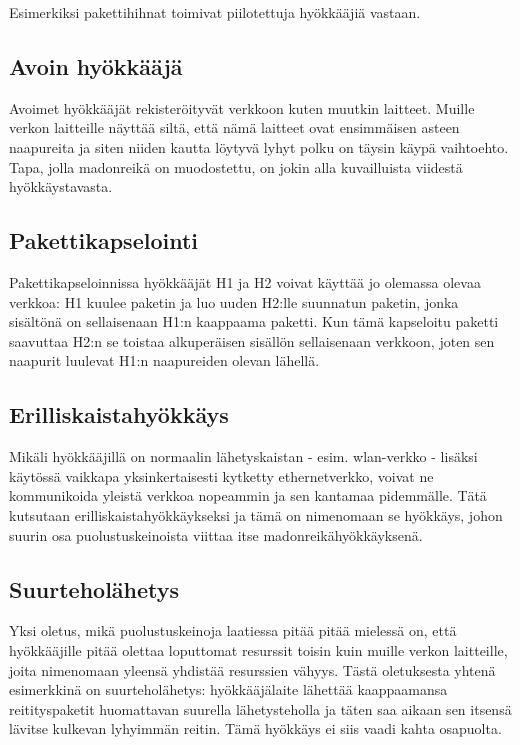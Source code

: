 \documentclass[finnish]{tktltiki2}
\theoremstyle{definition}
\theoremstyle{remark}
\begin{document}
Esimerkiksi pakettihihnat toimivat piilotettuja hyökkääjiä vastaan.

\subsection{Avoin hyökkääjä}

Avoimet hyökkääjät rekisteröityvät verkkoon kuten muutkin laitteet. Muille verkon laitteille näyttää siltä, että nämä laitteet ovat ensimmäisen asteen naapureita ja siten niiden kautta löytyvä lyhyt polku on täysin käypä vaihtoehto. Tapa, jolla madonreikä on muodostettu, on jokin alla kuvailluista viidestä hyökkäystavasta.

\subsection{Pakettikapselointi}

Pakettikapseloinnissa hyökkääjät H1 ja H2 voivat käyttää jo olemassa olevaa verkkoa: H1 kuulee paketin ja luo uuden H2:lle suunnatun paketin, jonka sisältönä on sellaisenaan H1:n kaappaama paketti. Kun tämä kapseloitu paketti saavuttaa H2:n se toistaa alkuperäisen sisällön sellaisenaan verkkoon, joten sen naapurit luulevat H1:n naapureiden olevan lähellä.

\subsection{Erilliskaistahyökkäys}

Mikäli hyökkääjillä on normaalin lähetyskaistan - esim. wlan-verkko - lisäksi käytössä vaikkapa yksinkertaisesti kytketty ethernetverkko, voivat ne kommunikoida yleistä verkkoa nopeammin ja sen kantamaa pidemmälle. Tätä kutsutaan erilliskaistahyökkäykseksi ja tämä on nimenomaan se hyökkäys, johon suurin osa puolustuskeinoista viittaa itse madonreikähyökkäyksenä.

\subsection{Suurteholähetys}

Yksi oletus, mikä puolustuskeinoja laatiessa pitää pitää mielessä on, että hyökkääjille pitää olettaa loputtomat resurssit toisin kuin muille verkon laitteille, joita nimenomaan yleensä yhdistää resurssien vähyys. Tästä oletuksesta yhtenä esimerkkinä on suurteholähetys: hyökkääjälaite lähettää kaappaamansa reitityspaketit huomattavan suurella lähetysteholla ja täten saa aikaan sen itsensä lävitse kulkevan lyhyimmän reitin. Tämä hyökkäys ei siis vaadi kahta osapuolta. 
\end{document}

